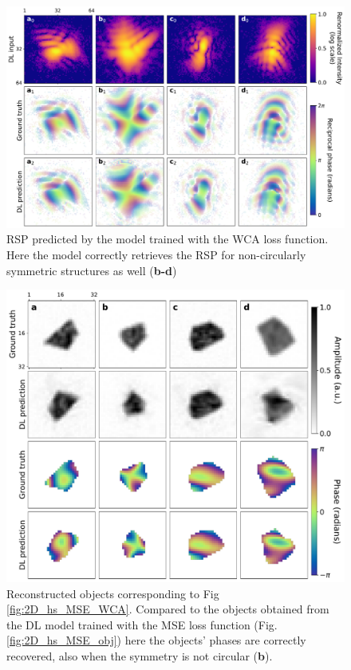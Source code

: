 \begin{figure}[H]
    \centering
    \includegraphics[width=\textwidth]{figures/Phasing/2D_hs_VFN_RSP.pdf}
    \caption{RSP predicted by the model trained with the WCA loss function. Here the model correctly retrieves the RSP for 
    non-circularly symmetric structures as well (\textbf{b-d})} 
    \label{fig:2D_hs_VFN_RSP}
\end{figure}

\begin{figure}[H]
    \centering
    \includegraphics[width=\textwidth]{figures/Phasing/2D_hs_VFN_obj.pdf}
    \caption{Reconstructed objects corresponding to Fig \ref{fig:2D_hs_MSE_WCA}. Compared to the objects obtained 
    from the DL model trained with the MSE loss function (Fig.\ref{fig:2D_hs_MSE_obj}) here the objects' phases are 
    correctly recovered, also when the symmetry is not circular (\textbf{b}).} 

    \label{fig:2D_hs_VFN_obj}
\end{figure}


